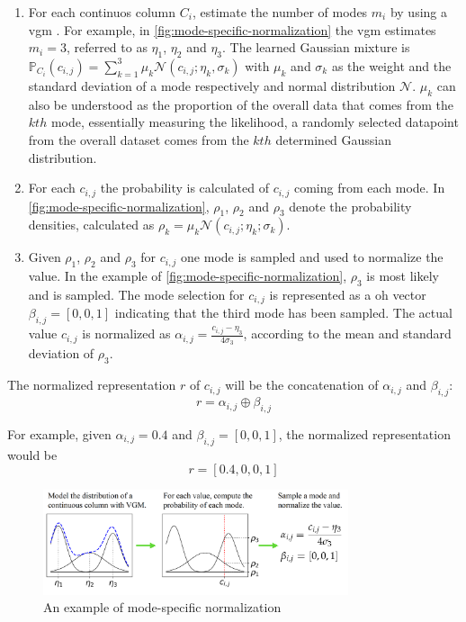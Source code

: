 \begin{enumerate}
    \item For each continuos column $C_i$, estimate the number of modes $m_i$ by using a \gls{vgm} \cite{bishop2006PatternRecognitionMachine}. 
    For example, in \autoref{fig:mode-specific-normalization} the \gls{vgm} estimates $m_i=3$, referred to as $\eta_1$, $\eta_2$ and $\eta_3$. 
    The learned Gaussian mixture is  
    $\mathbb{P}_{C_i}(c_{i,j})=\sum_{k=1}^{3}\mu_k\mathcal{N}(c_{i,j};\eta_k, \sigma_k)$
    with $\mu_k$ and $\sigma_k$ as the weight and the standard deviation of a mode respectively and normal distribution $\mathcal{N}$.
    $\mu_k$ can also be understood as the proportion of the overall data that comes from the $kth$ mode, essentially measuring the likelihood, a randomly selected datapoint from the overall dataset comes from the $kth$ determined Gaussian distribution.
    \item For each $c_{i,j}$ the probability is calculated of $c_{i,j}$ coming from each mode. 
    In \autoref{fig:mode-specific-normalization}, $\rho_1$, $\rho_2$ and $\rho_3$ denote the probability densities, calculated as $\rho_k=\mu_k\mathcal{N}(c_{i,j};\eta_k;\sigma_k)$.
    \item Given $\rho_1$, $\rho_2$ and $\rho_3$ for $c_{i,j}$ one mode is sampled and used to normalize the value. 
    In the example of \autoref{fig:mode-specific-normalization}, $\rho_3$ is most likely and is sampled.
    The mode selection for $c_{i,j}$ is represented as a \gls{oh} vector $\beta_{i,j}=[0,0,1]$ indicating that the third mode has been sampled.
    The actual value $c_{i,j}$ is normalized as $\alpha_{i,j}=\frac{c_{i,j}-\eta_3}{4\sigma_3}$, according to the mean and standard deviation of $\rho_3$. 
\end{enumerate}

The normalized representation $r$ of $c_{i,j}$ will be the concatenation of $\alpha_{i,j}$ and $\beta_{i,j}$: 
$$r=\alpha_{i,j}\oplus\beta_{i,j}$$

For example, given $\alpha_{i,j}=0.4$ and $\beta_{i,j}=[0,0,1]$, the normalized representation would be $$r=[0.4,0,0,1]$$

\begin{figure}[h]
    \centering
    \includegraphics[width=0.8\textwidth]{images/mode-normalization.png}
    \caption[Mode-Specific Normalization]{An example of mode-specific normalization \cite[Figure 1, p. 4]{xu2019ModelingTabularData}}
    \label{fig:mode-specific-normalization}
\end{figure}

